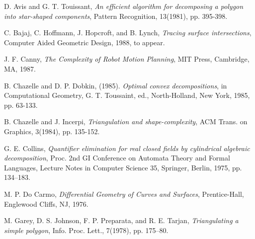 \begin{thebibliography}{Abhyankar 87b}
D. Avis and G. T. Touissant,
{\em An efficient algorithm for decomposing a polygon into star-shaped
components},
Pattern Recognition, 13(1981), pp. 395-398.


C. Bajaj, C. Hoffmann, J. Hopcroft, and B. Lynch,
{\em Tracing surface intersections},
Computer Aided Geometric Design, 1988, to appear.



J. F. Canny, 
{\em The Complexity of Robot Motion Planning},
MIT Press, Cambridge, MA, 1987.

B. Chazelle and D. P. Dobkin, (1985).
{\em Optimal convex decompositions},
in Computational Geometry, G. T. Toussaint, ed., North-Holland, New York, 1985, 
pp. 63-133.

 B. Chazelle and J. Incerpi, 
{\em Triangulation and shape-complexity},
ACM Trans. on Graphics, 3(1984), pp. 135-152.

G. E. Collins, 
{\em Quantifier elimination for real closed fields by cylindrical 
algebraic decomposition}, 
Proc. 2nd GI Conference on Automata Theory and Formal Languages, 
Lecture Notes in Computer Science 35, Springer, Berlin, 1975, pp. 134--183.


M. P. Do Carmo, 
{\em Differential Geometry of Curves and Surfaces},
Prentice-Hall, Englewood Cliffs, NJ, 1976.


M. Garey, D. S. Johnson, F. P. Preparata, and R. E. Tarjan,
{\em Triangulating a simple polygon},
Info. Proc. Lett., 7(1978), pp. 175--80.


\end{thebibliography}
